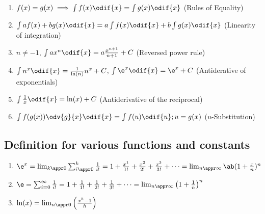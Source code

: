 \begin{enumerate}
	\item $f(x) = g(x) \implies \int f(x)\odif{x} = \int g(x)\odif{x}$ (Rules of Equality)
	\item $\int af(x) + bg(x) \odif{x} = a\int f(x)\odif{x} + b\int g(x)\odif{x}$ (Linearity of integration)
	\item $n \neq -1$, $\int ax^n\odif{x} = a\frac{x^{n + 1}}{n + 1} + C$ (Reversed power rule)
	\item $\int n^x\odif{x} = \frac{1}{\ln(n)}n^x + C$, $\int \e^x\odif{x} = \e^x + C$ (Antiderative of exponentials)
	\item $\int \frac{1}{x}\odif{x} = \ln(x) + C$ (Antiderivative of the reciprocal)
	\item $\int f(g(x))\odv{g}{x}\odif{x} = \int f(u)\odif{u}; u = g(x)$ ($u$-Substitution)
\end{enumerate}

\subsection{Definition for various functions and constants}

\begin{enumerate}
	\item $\e^x = \lim_{k \appr 0}\sum_{i \appr 0}^{k}\frac{1}{i!} = 1 + \frac{x^1}{1!} + \frac{x^2}{2!} + \frac{x^3}{3!} + \dots = \lim_{n \appr \infty}\ab(1 + \frac{x}{n})^n$
	\item $\e = \sum_{i = 0}^{\infty}\frac{1}{i!} = 1 + \frac{1}{1!} + \frac{1}{2!} + \frac{1}{3!} + \dots = \lim_{n \appr \infty}\left(1 + \frac{1}{n}\right)^n$
	\item $\ln(x) = \lim_{n \appr 0}\left(\frac{x^h - 1}{h}\right)$
\end{enumerate}

\everymath{\textstyle}

